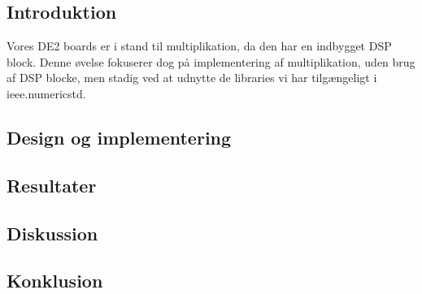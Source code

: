 \documentclass[../journal2.tex]{subfiles}
\begin{document}
\subsection{Introduktion}

Vores DE2 boards er i stand til multiplikation, da den har en indbygget DSP block. Denne øvelse fokuserer dog på implementering af multiplikation, uden brug af DSP blocke, men stadig ved at udnytte de libraries vi har tilgængeligt i ieee.numeric\textunderscore std.

\subsection{Design og implementering}

\begin{table}[H]
    \centering
      \framebox{
        \rule{8pt}{0pt}
          
  }
  \caption{Architecture af shift\textunderscore div}
  \label{src:shift_div2}
\end{table}

\subsection{Resultater}

\subsection{Diskussion}

\subsection{Konklusion}
\end{document}
